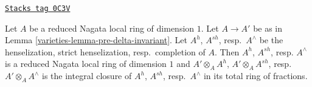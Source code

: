 \begin{lemma}
\label{varieties-lemma-normalization-same-after-completion}
\href{https://stacks.math.columbia.edu/tag/0C3V}{\texttt{Stacks tag 0C3V}}

Let $A$ be a reduced Nagata local ring of dimension $1$.
Let $A \to A'$ be as in Lemma \ref{varieties-lemma-pre-delta-invariant}.
Let $A^h$, $A^{sh}$, resp.\ $A^\wedge$
be the henselization, strict henselization, resp.\ completion of $A$.
Then $A^h$, $A^{sh}$, resp. $A^\wedge$ is a reduced Nagata local
ring of dimension $1$ and
$A' \otimes_A A^h$, $A' \otimes_A A^{sh}$, resp. $A' \otimes_A A^\wedge$
is the integral closure of $A^h$, $A^{sh}$, resp.\ $A^\wedge$
in its total ring of fractions.
\end{lemma}

